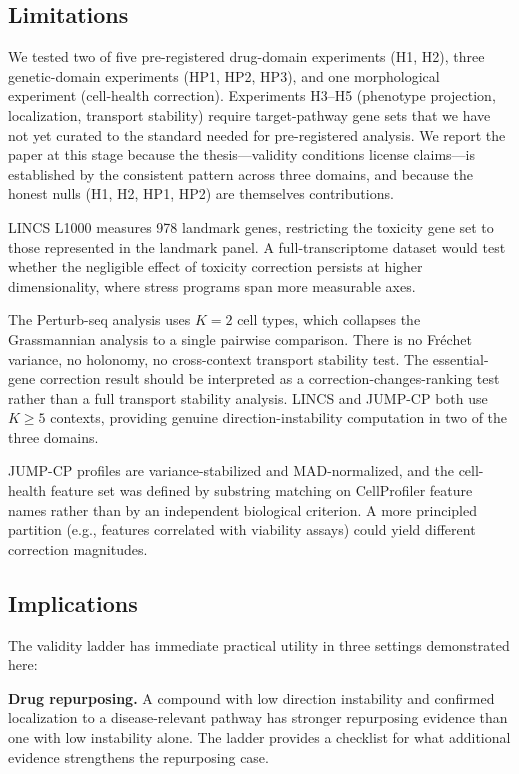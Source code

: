 \documentclass{article}
\begin{document}
\subsection{Limitations}

We tested two of five pre-registered drug-domain experiments (H1, H2),
three genetic-domain experiments (HP1, HP2, HP3), and one morphological
experiment (cell-health correction). Experiments H3--H5
(phenotype projection, localization, transport stability) require
target-pathway gene sets that we have not yet curated to the standard needed
for pre-registered analysis. We report the paper at this stage because the
thesis---validity conditions license claims---is established by the
consistent pattern across three domains, and because the honest nulls (H1,
H2, HP1, HP2) are themselves contributions.

LINCS L1000 measures 978 landmark genes, restricting the toxicity gene set to
those represented in the landmark panel. A full-transcriptome dataset would
test whether the negligible effect of toxicity correction persists at higher
dimensionality, where stress programs span more measurable axes.

The Perturb-seq analysis uses $K = 2$ cell types, which collapses the
Grassmannian analysis to a single pairwise comparison. There is no Fr\'echet
variance, no holonomy, no cross-context transport stability test. The
essential-gene correction result should be interpreted as a
correction-changes-ranking test rather than a full transport stability
analysis. LINCS and JUMP-CP both use $K \geq 5$ contexts, providing
genuine direction-instability computation in two of the three domains.

JUMP-CP profiles are variance-stabilized and MAD-normalized, and the
cell-health feature set was defined by substring matching on CellProfiler
feature names rather than by an independent biological criterion. A more
principled partition (e.g., features correlated with viability assays)
could yield different correction magnitudes.

\subsection{Implications}

The validity ladder has immediate practical utility in three settings
demonstrated here:

\textbf{Drug repurposing.} A compound with low direction instability and
confirmed localization to a disease-relevant pathway has stronger repurposing
evidence than one with low instability alone. The ladder provides a checklist
for what additional evidence strengthens the repurposing case.
\end{document}
